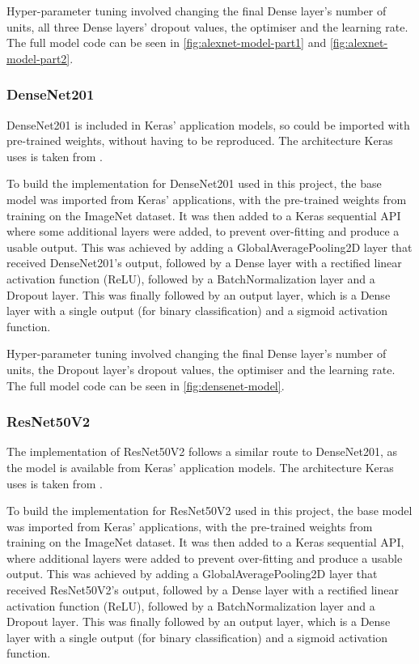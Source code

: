 Hyper-parameter tuning involved changing the final Dense layer's number of units, all three Dense layers' dropout values, the optimiser and the learning rate. The full model code can be seen in \autoref{fig:alexnet-model-part1} and \autoref{fig:alexnet-model-part2}.

\subsubsection{DenseNet201}
DenseNet201 is included in Keras' application models, so could be imported with pre-trained weights, without having to be reproduced. The architecture Keras uses is taken from \cite{huang2017densely}.

To build the implementation for DenseNet201 used in this project, the base model was imported from Keras' applications, with the pre-trained weights from training on the ImageNet dataset. It was then added to a Keras sequential API where some additional layers were added, to prevent over-fitting and produce a usable output. This was achieved by adding a GlobalAveragePooling2D layer that received DenseNet201's output, followed by a Dense layer with a rectified linear activation function (ReLU), followed by a BatchNormalization layer and a Dropout layer. This was finally followed by an output layer, which is a Dense layer with a single output (for binary classification) and a sigmoid activation function.

Hyper-parameter tuning involved changing the final Dense layer's number of units, the Dropout layer's dropout values, the optimiser and the learning rate. The full model code can be seen in \autoref{fig:densenet-model}.

\subsubsection{ResNet50V2}
The implementation of ResNet50V2 follows a similar route to DenseNet201, as the model is available from Keras' application models. The architecture Keras uses is taken from \cite{he2016identity}.

To build the implementation for ResNet50V2 used in this project, the base model was imported from Keras' applications, with the pre-trained weights from training on the ImageNet dataset. It was then added to a Keras sequential API, where additional layers were added to prevent over-fitting and produce a usable output. This was achieved by adding a GlobalAveragePooling2D layer that received ResNet50V2's output, followed by a Dense layer with a rectified linear activation function (ReLU), followed by a BatchNormalization layer and a Dropout layer. This was finally followed by an output layer, which is a Dense layer with a single output (for binary classification) and a sigmoid activation function.

